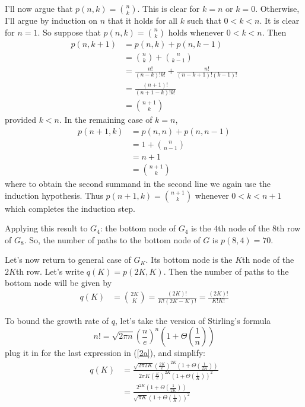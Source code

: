 \documentclass[
]{article}
\begin{document}
I'll now argue that $p(n,k)=\binom{n}{k}$.  This is clear for $k=n$ or $k=0$.
Otherwise, I'll argue by induction on $n$ that it holds for all $k$ such that $0<k<n$.
It is clear for $n=1$.  So suppose that $p(n,k)=\binom{n}{k}$ holds whenever $0<k<n$.
Then
\begin{align*}
p(n,k+1)
&=
p(n,k) + p(n, k-1)\\
&=
\binom{n}{k} + \binom{n}{k-1}\\
&=
\frac{n!}{(n-k)!k!}+\frac{n!}{(n-k+1)!(k-1)!}\\
&= 
\frac{(n+1)!}{(n+1-k)!k!}\\
&=
\binom{n+1}{k}
\end{align*}
provided $k<n$.  In the remaining case of $k=n$,
\begin{align*}
p(n+1, k) 
&= 
p(n,n)+p(n,n-1)\\
&=
1 + \binom{n}{n-1}\\
&=
n+1\\
&=
\binom{n+1}{k}
\end{align*} where to obtain the second summand in the second line we again use the induction hypothesis.  Thus $p(n+1, k)=\binom{n+1}{k}$ whenever $0<k<n+1$ which completes the induction step.


Applying this result to $G_4$: the bottom node of $G_4$ is the $4$th node of the $8$th row of $G_8$.  So, the number of paths to the bottom node of $G$ is $p(8,4)=70$.

Let's now return to general case of $G_K$.  Its bottom node is the $K$th node of the $2K$th row.  Let's write $q(K)=p(2K,K)$.  Then the number of paths to the bottom node will be given by
\begin{align}
\label{2a}
q(K)&=\binom{2K}{K}
=\frac{(2K)!}{K!(2K-K)!}
=\frac{(2K)!}{K!K!}
\end{align}

To bound the growth rate of $q$, let's take the version of Stirling's formula
\begin{equation*}
n!=\sqrt{2\pi n}\left(\frac{n}{e}\right)^n\left(1+\Theta\left(\frac{1}{n}\right)\right)
\end{equation*}
 plug it in for the last expression in (\ref{2a}), and simplify:
\begin{align}
\nonumber
q(K) & =
\frac
{\sqrt{2\pi 2K}(\frac{2K}{e})^{2K}\left(1+\Theta\left(\frac{1}{2K}\right)\right)}
{2\pi K(\frac{K}{e})^{2K}\left(1+\Theta\left(\frac{1}{K}\right)\right)^2}\\
&=
\label{2c}
\frac
{2^{2K}\left(1+\Theta\left(\frac{1}{2K}\right)\right)}
{\sqrt{\pi K}\left(1+\Theta\left(\frac{1}{K}\right)\right)^2}
\end{align}
\end{document}
